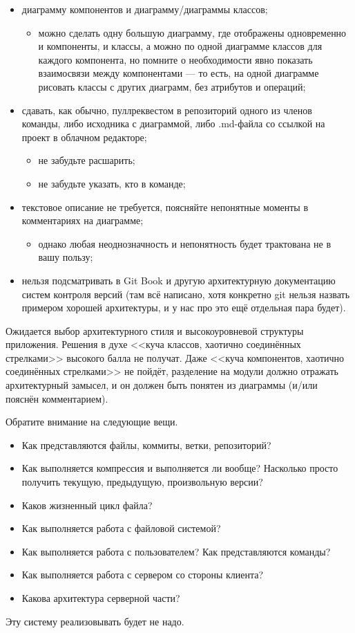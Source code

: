 \documentclass[a5paper]{article}
\begin{document}
\begin{itemize}
    \item диаграмму компонентов и диаграмму/диаграммы классов;
    \begin{itemize}
        \item можно сделать одну большую диаграмму, где отображены одновременно и компоненты, и классы, а можно по одной диаграмме классов для каждого компонента, но помните о необходимости явно показать взаимосвязи между компонентами --- то есть, на одной диаграмме рисовать классы с других диаграмм, без атрибутов и операций;
    \end{itemize}
    \item сдавать, как обычно, пуллреквестом в репозиторий одного из членов команды, либо исходника с диаграммой, либо .md-файла со ссылкой на проект в облачном редакторе;
    \begin{itemize}
        \item не забудьте расшарить;
        \item не забудьте указать, кто в команде;
    \end{itemize}
    \item текстовое описание не требуется, поясняйте непонятные моменты в комментариях на диаграмме;
    \begin{itemize}
        \item однако любая неоднозначность и непонятность будет трактована не в вашу пользу;
    \end{itemize}
    \item нельзя подсматривать в Git Book и другую архитектурную документацию систем контроля версий (там всё написано, хотя конкретно git нельзя назвать примером хорошей архитектуры, и у нас про это ещё отдельная пара будет).
\end{itemize}

Ожидается выбор архитектурного стиля и высокоуровневой структуры приложения. Решения в духе <<куча классов, хаотично соединённых стрелками>> высокого балла не получат. Даже <<куча компонентов, хаотично соединённых стрелками>> не пойдёт, разделение на модули должно отражать архитектурный замысел, и он должен быть понятен из диаграммы (и/или пояснён комментарием).

Обратите внимание на следующие вещи.

\begin{itemize}
    \item Как представляются файлы, коммиты, ветки, репозиторий?
    \item Как выполняется компрессия и выполняется ли вообще? Насколько просто получить текущую, предыдущую, произвольную версии?
    \item Каков жизненный цикл файла?
    \item Как выполняется работа с файловой системой?
    \item Как выполняется работа с пользователем? Как представляются команды?
    \item Как выполняется работа с сервером со стороны клиента?
    \item Какова архитектура серверной части?
\end{itemize}

Эту систему реализовывать будет не надо.
\end{document}
